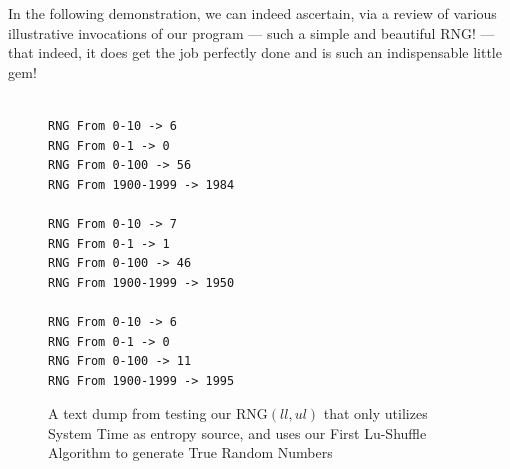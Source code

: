 \documentclass[a4paper, 18pt]{book} %
\begin{document}
In the following demonstration, we can indeed ascertain, via a review of various illustrative invocations of our program --- such a simple and beautiful RNG! --- that indeed, it does get the job perfectly done and is such an indispensable little gem!

\begin{figure}[H]
  \begin{center}
  \begin{lstlisting}[caption={A TESTING Our RANDOM NUMBER GENERATOR }, label={LST_RNG_TEST}, frame=single, numbers=none, basicstyle=\ttfamily,  commentstyle=\color{blue}, breaklines=true, breakatwhitespace=false]

RNG From 0-10 -> 6
RNG From 0-1 -> 0
RNG From 0-100 -> 56
RNG From 1900-1999 -> 1984

RNG From 0-10 -> 7
RNG From 0-1 -> 1
RNG From 0-100 -> 46
RNG From 1900-1999 -> 1950

RNG From 0-10 -> 6
RNG From 0-1 -> 0
RNG From 0-100 -> 11
RNG From 1900-1999 -> 1995

\end{lstlisting}
  \end{center}
  \caption{A text dump from testing our RNG$(ll,ul)$ that only utilizes System Time as entropy source, and uses our First Lu-Shuffle Algorithm to generate True Random Numbers}
  \label{RNGTESTDUMP}
\end{figure}
\end{document}
